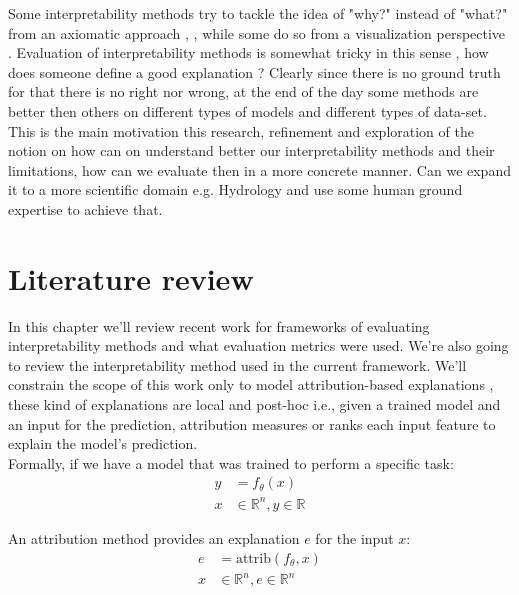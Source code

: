 \documentclass[12pt]{report}
\begin{document}
Some interpretability methods try to tackle the idea of "why?" instead of "what?" from an axiomatic approach 
\cite{DBLP:journals/corr/SundararajanTY17}, \cite{DBLP:journals/corr/abs-2111-07668},  while some do so
from a visualization perspective \cite{DBLP:journals/corr/abs-1802-00614}. Evaluation of interpretability methods is somewhat tricky in this sense , how does someone define a good explanation ? Clearly since there is no ground truth for that there is no right nor wrong, at the end of the day some methods are better then others on different types of models and different types of data-set. \\ 

This is the main motivation this research,  refinement and exploration of the notion on how can on understand better our interpretability methods and their limitations, how can we evaluate then in a more concrete manner. Can we expand it to a more scientific domain e.g. Hydrology and use some human ground expertise to achieve that. 


\newpage

\chapter{Literature review} 

In this chapter we'll review recent work for frameworks of evaluating interpretability methods and what evaluation metrics were used. We're also going to review the interpretability method used in the current framework. We'll constrain the scope of this work only to model attribution-based explanations \cite{electronics10050593}, these kind of explanations are local and post-hoc i.e., given a trained model and an input for the prediction, attribution measures or ranks each input feature to explain the model's prediction. \\

Formally, if we have a model that was trained to perform a specific task:
\begin{align*}
	y & = f_{\theta}(x) \\
	x & \in \mathbb{R}^n, y \in \mathbb{R}
\end{align*}

An attribution method provides an explanation $e$ for the input $x$:
\begin{align*}
	e &= \text{attrib}(f_{\theta}, x) \\
	x & \in \mathbb{R}^n, e \in \mathbb{R}^n
\end{align*}
\end{document}
